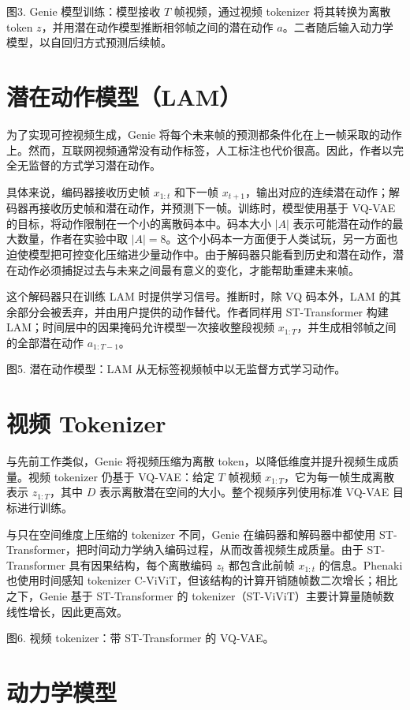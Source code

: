 \documentclass[10pt]{article}
\begin{document}
图3. Genie 模型训练：模型接收 $T$ 帧视频，通过视频 tokenizer 将其转换为离散 token $z$，并用潜在动作模型推断相邻帧之间的潜在动作 $a$。二者随后输入动力学模型，以自回归方式预测后续帧。

\section*{潜在动作模型（LAM）}

为了实现可控视频生成，Genie 将每个未来帧的预测都条件化在上一帧采取的动作上。然而，互联网视频通常没有动作标签，人工标注也代价很高。因此，作者以完全无监督的方式学习潜在动作。

具体来说，编码器接收历史帧 $x_{1:t}$ 和下一帧 $x_{t+1}$，输出对应的连续潜在动作；解码器再接收历史帧和潜在动作，并预测下一帧。训练时，模型使用基于 VQ-VAE 的目标，将动作限制在一个小的离散码本中。码本大小 $|A|$ 表示可能潜在动作的最大数量，作者在实验中取 $|A|=8$。这个小码本一方面便于人类试玩，另一方面也迫使模型把可控变化压缩进少量动作中。由于解码器只能看到历史和潜在动作，潜在动作必须捕捉过去与未来之间最有意义的变化，才能帮助重建未来帧。

这个解码器只在训练 LAM 时提供学习信号。推断时，除 VQ 码本外，LAM 的其余部分会被丢弃，并由用户提供的动作替代。作者同样用 ST-Transformer 构建 LAM；时间层中的因果掩码允许模型一次接收整段视频 $x_{1:T}$，并生成相邻帧之间的全部潜在动作 $a_{1:T-1}$。

图5. 潜在动作模型：LAM 从无标签视频帧中以无监督方式学习动作。

\section*{视频 Tokenizer}

与先前工作类似，Genie 将视频压缩为离散 token，以降低维度并提升视频生成质量。视频 tokenizer 仍基于 VQ-VAE：给定 $T$ 帧视频 $x_{1:T}$，它为每一帧生成离散表示 $z_{1:T}$，其中 $D$ 表示离散潜在空间的大小。整个视频序列使用标准 VQ-VAE 目标进行训练。

与只在空间维度上压缩的 tokenizer 不同，Genie 在编码器和解码器中都使用 ST-Transformer，把时间动力学纳入编码过程，从而改善视频生成质量。由于 ST-Transformer 具有因果结构，每个离散编码 $z_t$ 都包含此前帧 $x_{1:t}$ 的信息。Phenaki 也使用时间感知 tokenizer C-ViViT，但该结构的计算开销随帧数二次增长；相比之下，Genie 基于 ST-Transformer 的 tokenizer（ST-ViViT）主要计算量随帧数线性增长，因此更高效。

图6. 视频 tokenizer：带 ST-Transformer 的 VQ-VAE。

\section*{动力学模型}
\end{document}
